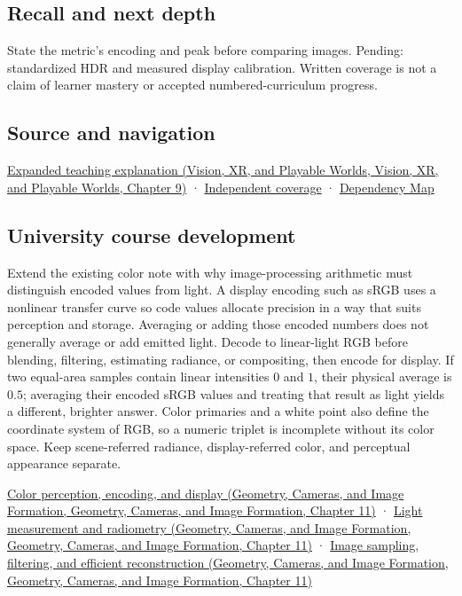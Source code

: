 \subsection{Recall and next depth}\label{appendix-a9f83ad40792-recall-and-next-depth}

State the metric's encoding and peak before comparing images. Pending: standardized HDR and measured display calibration. Written coverage is not a claim of learner mastery or accepted numbered-curriculum progress.

\subsection{Source and navigation}\label{appendix-a9f83ad40792-source-and-navigation}

\href{../07-Vision-XR-and-Playable-Worlds/main.pdf\#nameddest=04-visual-computing-ii-ch042-encoded-rgb-must-not-masquerade-as-linear-light}{Expanded teaching explanation (Vision, XR, and Playable Worlds, Vision, XR, and Playable Worlds, Chapter 9)} · \hyperref[appendix-fd090d982a15-xr01---independent-seeing-and-representation-source]{Independent coverage} · \hyperref[appendix-4ad47bdd269a]{Dependency Map}

\subsection{University course development}\label{appendix-a9f83ad40792-university-course-development}

Extend the existing color note with why image-processing arithmetic must distinguish encoded values from light. A display encoding such as sRGB uses a nonlinear transfer curve so code values allocate precision in a way that suits perception and storage. Averaging or adding those encoded numbers does not generally average or add emitted light. Decode to linear-light RGB before blending, filtering, estimating radiance, or compositing, then encode for display. If two equal-area samples contain linear intensities \(0\) and \(1\), their physical average is \(0.5\); averaging their encoded sRGB values and treating that result as light yields a different, brighter answer. Color primaries and a white point also define the coordinate system of RGB, so a numeric triplet is incomplete without its color space. Keep scene-referred radiance, display-referred color, and perceptual appearance separate.

\href{../03-Geometry-Cameras-and-Image-Formation/main.pdf\#nameddest=03-visual-computing-i-ch004-color-perception-encoding-and-display}{Color perception, encoding, and display (Geometry, Cameras, and Image Formation, Geometry, Cameras, and Image Formation, Chapter 11)} · \href{../03-Geometry-Cameras-and-Image-Formation/main.pdf\#nameddest=03-visual-computing-i-ch004-light-measurement-and-radiometry}{Light measurement and radiometry (Geometry, Cameras, and Image Formation, Geometry, Cameras, and Image Formation, Chapter 11)} · \href{../03-Geometry-Cameras-and-Image-Formation/main.pdf\#nameddest=03-visual-computing-i-ch004-image-sampling-filtering-and-efficient-reconstruction}{Image sampling, filtering, and efficient reconstruction (Geometry, Cameras, and Image Formation, Geometry, Cameras, and Image Formation, Chapter 11)}
